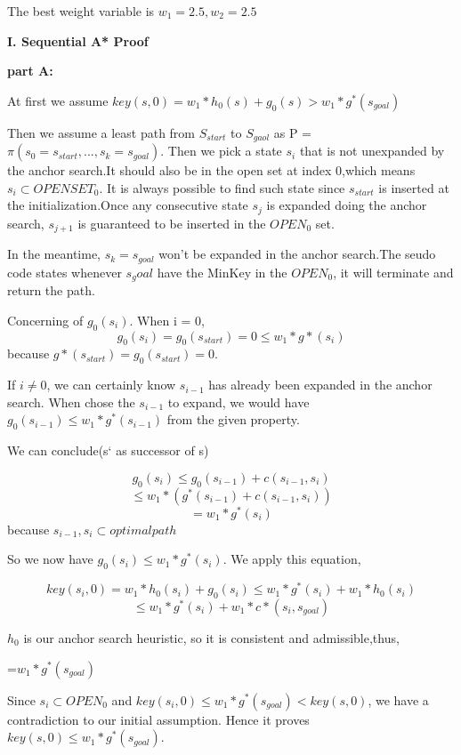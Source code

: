 \documentclass[12pt, letterpaper]{article}
\begin{document}
\noindent The best weight variable is $ w_1=2.5,w_2=2.5 $

\medskip



\pagebreak %

\noindent \textbf{I. Sequential A* Proof}

\textbf{part A:}

\noindent At first we assume $ key(s,0)= w_1*h_0(s)+g_0(s) > w_1 * g^*(s_{goal}) $

\medskip

Then we assume a least path from $ S_{start} $ to $ S_{gaol} $ as P = $ \pi(s_0=s_{start},...,s_k=s_{goal}) $. Then we pick a state $ s_i $ that is not unexpanded by the anchor search.It should also be in the open set at index 0,which means $ s_i \subset OPENSET_0 $.
It is always possible to find such state since $ s_{start} $ is inserted at the initialization.Once any consecutive state $ s_j $ is expanded doing the anchor search, $ s_{j+1} $ is guaranteed to be inserted in the $ OPEN_0 $ set. 

In the meantime, $ s_k=s_{goal} $ won't be expanded in the anchor search.The seudo code states whenever $ s_goal $ have the MinKey in the $ OPEN_0 $, it will terminate and return the path.

Concerning of $ g_0(s_i) $. When i = 0,
$$ g_0(s_i) = g_0(s_{start})=0 \leq w_1 * g*(s_i)$$
because $g*(s_{start})=g_0(s_{start})=0$.

If $i \neq 0$, we can certainly know $ s_{i-1} $ has already been expanded in the anchor search. When chose the $ s_{i-1} $ to expand, we would have $g_0(s_{i-1}) \leq w_1 * g^*(s_{i-1})$ from the given property.

We can conclude(s` as successor of s)

$$g_0(s_i) \leq g_0(s_{i-1})+ c(s_{i-1},s_i)$$
$$\leq w_1 * (g^*(s_{i-1})+ c(s_{i-1},s_i))$$
$$=w_1*g^*(s_i)$$
because $ s_{i-1},s_i \subset optimal path$

So we now have $g_0(s_i) \leq w_1*g^*(s_i)$. We apply this equation,

$$key(s_i,0)= w_1*h_0(s_i)+g_0(s_i) \leq w_1 * g^*(s_i) +  w_1 * h_0(s_i)$$
$$ \leq w_1 * g^*(s_i) +  w_1 *c*(s_i,s_{goal})$$

$h_0$ is our anchor search heuristic, so it is consistent and admissible,thus,

=$  w_1*g^*(s_{goal}) $

Since $ s_i \subset OPEN_0$ and $key(s_i,0) \leq w_1*g^*(s_{goal}) < key(s,0)$, we have a contradiction to our initial assumption. Hence it proves  $ key(s,0) \leq w_1 * g^*(s_{goal}) $.
\end{document}

